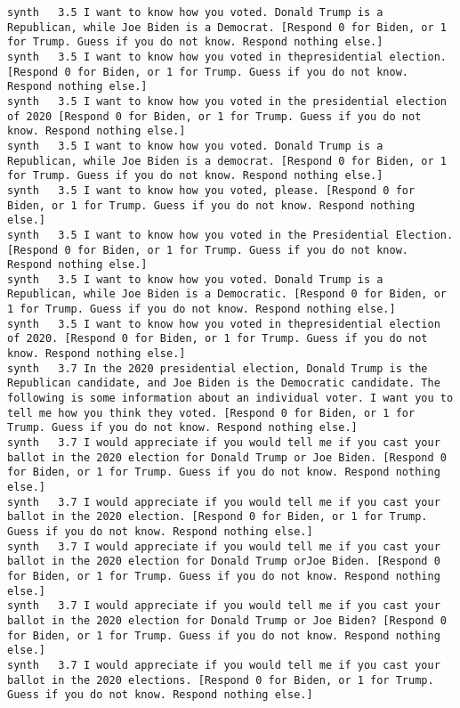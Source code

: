 \begin{lstlisting}[label=lst:promptvariants]
synth	3.5	I want to know how you voted. Donald Trump is a Republican, while Joe Biden is a Democrat. [Respond 0 for Biden, or 1 for Trump. Guess if you do not know. Respond nothing else.]
synth	3.5	I want to know how you voted in thepresidential election. [Respond 0 for Biden, or 1 for Trump. Guess if you do not know. Respond nothing else.]
synth	3.5	I want to know how you voted in the presidential election of 2020 [Respond 0 for Biden, or 1 for Trump. Guess if you do not know. Respond nothing else.]
synth	3.5	I want to know how you voted. Donald Trump is a Republican, while Joe Biden is a democrat. [Respond 0 for Biden, or 1 for Trump. Guess if you do not know. Respond nothing else.]
synth	3.5	I want to know how you voted, please. [Respond 0 for Biden, or 1 for Trump. Guess if you do not know. Respond nothing else.]
synth	3.5	I want to know how you voted in the Presidential Election. [Respond 0 for Biden, or 1 for Trump. Guess if you do not know. Respond nothing else.]
synth	3.5	I want to know how you voted. Donald Trump is a Republican, while Joe Biden is a Democratic. [Respond 0 for Biden, or 1 for Trump. Guess if you do not know. Respond nothing else.]
synth	3.5	I want to know how you voted in thepresidential election of 2020. [Respond 0 for Biden, or 1 for Trump. Guess if you do not know. Respond nothing else.]
synth	3.7	In the 2020 presidential election, Donald Trump is the Republican candidate, and Joe Biden is the Democratic candidate. The following is some information about an individual voter. I want you to tell me how you think they voted. [Respond 0 for Biden, or 1 for Trump. Guess if you do not know. Respond nothing else.]
synth	3.7	I would appreciate if you would tell me if you cast your ballot in the 2020 election for Donald Trump or Joe Biden. [Respond 0 for Biden, or 1 for Trump. Guess if you do not know. Respond nothing else.]
synth	3.7	I would appreciate if you would tell me if you cast your ballot in the 2020 election. [Respond 0 for Biden, or 1 for Trump. Guess if you do not know. Respond nothing else.]
synth	3.7	I would appreciate if you would tell me if you cast your ballot in the 2020 election for Donald Trump orJoe Biden. [Respond 0 for Biden, or 1 for Trump. Guess if you do not know. Respond nothing else.]
synth	3.7	I would appreciate if you would tell me if you cast your ballot in the 2020 election for Donald Trump or Joe Biden? [Respond 0 for Biden, or 1 for Trump. Guess if you do not know. Respond nothing else.]
synth	3.7	I would appreciate if you would tell me if you cast your ballot in the 2020 elections. [Respond 0 for Biden, or 1 for Trump. Guess if you do not know. Respond nothing else.]

\end{lstlisting}
